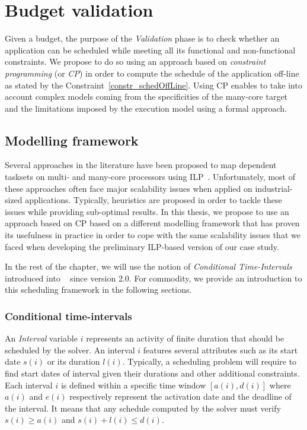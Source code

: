 \documentclass[main.tex]{subfiles}
\begin{document}
\section{Budget validation}
Given a budget, the purpose of the \emph{Validation} phase is to check whether an application can be scheduled while meeting all its functional and non-functional constraints. We propose to do so using an approach based on \emph{constraint programming} (or \emph{CP}) in order to compute the schedule of the application off-line as stated by the Constraint~\ref{constr_schedOffLine}. Using CP enables to take into account complex models coming from the specificities of the many-core target and the limitations imposed by the execution model using a formal approach. 

\subsection{Modelling framework}
Several approaches in the literature have been proposed to map dependent tasksets on multi- and many-core processors using ILP~\cite{Becker16,gorcitz2015,PuffitschNP15}. Unfortunately, most of these approaches often face major scalability issues when applied on industrial-sized applications. Typically, heuristics are proposed in order to tackle these issues while providing sub-optimal results. In this thesis, we propose to use an approach based on CP based on a different modelling framework that has proven its usefulness in practice in order to cope with the same scalability issues that we faced when developing the preliminary ILP-based version of our case study. 

In the rest of the chapter, we will use the notion of \emph{Conditional Time-Intervals}~\cite{Laborie08, Laborie09} introduced into \CPOpti~\cite{OPL} since version 2.0. For commodity, we provide an introduction to this scheduling framework in the following sections.

\subsubsection{Conditional time-intervals}
An \emph{Interval} variable $i$ represents an activity of finite duration that should be scheduled by the solver. An interval $i$ features several attributes such as its start date $s(i)$ or its duration $l(i)$. Typically, a scheduling problem will require to find start dates of interval given their durations and other additional constraints. Each interval $i$ is defined within a specific time window $[a(i) , d(i)]$ where $a(i)$ and $e(i)$ respectively represent the activation date and the deadline of the interval. It means that any schedule computed by the solver must verify $s(i) \geq a(i)$ and $s(i)+l(i) \leq d(i)$.
\end{document}
